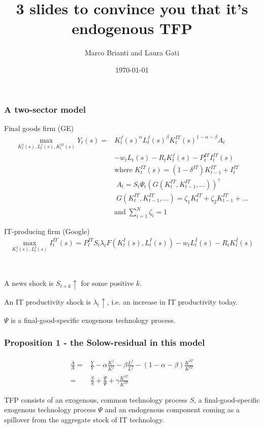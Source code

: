 \documentclass{beamer}
\author[Brianti, Gati]{Marco Brianti and Laura Gati}
\institute[Boston College]{Boston College}
\title{3 slides to convince you that it's endogenous TFP}
\date{\today}
\begin{document}
\begin{frame}

\maketitle


\end{frame}


\begin{frame}
\frametitle{A two-sector model}

Final goods firm (GE)
\begin{align*}
\max_{K^f_t(s), L^f_t(s), K^{IT}_t(s) } Y_t(s) =  & K^f_t(s)^{\alpha}L^f_t(s)^{\beta}K^{IT}_t(s)^{1-\alpha - \beta}A_t \\
 & - w_t L_t(s) -R_tK^f_t(s) -P^{IT}_t I^{IT}_t(s) \\
 & \text{where} \; K^{IT}_t(s) =  (1-\delta^{IT})K^{IT}_{t-1} + I^{IT}_t \\
 &  \; A_t =  S_t \Psi_t (G(K^{IT}_t,K^{IT}_{t-1},\dots))^{\gamma} \\
 &  \; G(K^{IT}_t,K^{IT}_{t-1},\dots) = \zeta_1 K_t^{IT} + \zeta_2 K^{IT}_{t-1} + \dots \\
  & \text{and} \; \sum_{i=1}^{N} \zeta_i = 1
\end{align*}

\end{frame}

\begin{frame}

IT-producing firm (Google)
\begin{align*}
\max_{K^{I}_t(s), L^{I}_t(s)} I^{IT}_t(s) = P^{IT}_t S_t \lambda_t F(K^I_t(s), L^I_t(s)) -w_t L^I_t(s) - R_t K^I_t(s)
\end{align*}

\

A news shock is $S_{t+k} \uparrow$ for some positive $k$. 

An IT productivity shock is $\lambda_{t} \uparrow$, i.e. an increase in IT productivity today. 

$\Psi$ is a final-good-specific exogenous technology process.

\end{frame}

\begin{frame}
\frametitle{Proposition 1 - the Solow-residual in this model}

\begin{align*}
\frac{\dot{A}}{A} = & \frac{\dot{Y}}{Y} - \alpha \frac{\dot{K^f}}{K^f} - \beta \frac{\dot{L^f}}{L^f} - (1-\alpha - \beta) \frac{\dot{K^{IT}}}{K^{IT}} \\
= & \frac{\dot{S}}{S} + \frac{\dot{\Psi}}{\Psi} + \gamma \frac{\dot{K^{IT}}}{K^{IT}}
\end{align*}

TFP consists of an exogenous, common technology process $S$, a final-good-specific exogenous technology process $\Psi$ and an endogenous component coming as a spillover from the aggregate stock of IT technology. 
\end{frame}
\end{document}
